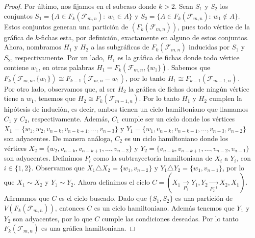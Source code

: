 \begin{proof}
        Por \'ultimo, nos fijamos en el subcaso donde $k>2$. Sean $S_1$ y $S_2$
        los conjuntos $S_1=\{A \in F_k(\mathcal{F}_{m,n}) \colon\ w_1 \in A\}$ y $S_2=\{A
        \in F_k(\mathcal{F}_{m,n}) \colon\ w_1 \notin A\}$. Estos conjuntos generan una
        partici\'on de $(F_k(\mathcal{F}_{m,n}))$, pues todo v\'ertice de la gr\'afica de
        $k$-fichas esta, por definici\'on, exactamente en alguno de estos
        conjuntos. Ahora, nombramos $H_1$ y $H_2$ a las subgr\'aficas de
        $F_k(\mathcal{F}_{m,n})$ inducidas por $S_1$ y $S_2$, respectivamente. Por un
        lado, $H_1$ es la gr\'afica de fichas donde todo v\'ertice contiene
        $w_1$, en otras palabras $H_1= F_k(\mathcal{F}_{m,n},\{w_1\})$. Sabemos que
        $F_k(\mathcal{F}_{m,n},\{w_1\}) \cong F_{k-1}(\mathcal{F}_{m,n}- w_1)$, por lo tanto $H_1
        \cong F_{k-1}(\mathcal{F}_{m-1,n})$. Por otro lado, observamos que, al ser $H_2$
        la gr\'afica de fichas donde ning\'un v\'ertice tiene a $w_1$, tenemos
        que $H_2 \cong F_k(\mathcal{F}_{m-1,n})$. Por lo tanto $H_1$ y $H_2$ cumplen la
        hip\'otesis de induci\'on, es decir, ambos tienen un ciclo hamiltoniano
        que llamamos $C_1$ y $C_2$, respectivamente. Adem\'as, $C_1$ cumple ser
        un ciclo donde los v\'ertices $X_1 = \{w_1, w_2,v_{n-k},v_{n-k+1},
        \dots, v_{n-3}\}$ y $Y_1 = \{w_1,v_{n-k},v_{n-k+1}, \dots,
        v_{n-3},v_{n-2}\}$ son adyacentes. De manera an\'aloga, $C_2$ es un
        ciclo hamiltoniano donde los v\'ertices $X_2 = \{ w_2,v_{n-k},v_{n-k+1},
        \dots, v_{n-2}\}$ y $Y_2 = \{v_{n-k},v_{n-k+1}, \dots,
        v_{n-2},v_{n-1}\}$ son adyacentes. Definimos $P_i$ como la
        subtrayectoria hamiltoniana de $X_i$ a $Y_i$, con $i \in \{ 1,2 \}$.
        Observamos que $X_1 \triangle X_2 = \{w_1,v_{n-2}\}$ y $Y_1 \triangle
        Y_2 = \{w_1, v_{n-1}\}$, por lo que $X_1 \sim X_2$ y $Y_1 \sim Y_2$.
        Ahora definimos el ciclo $C = (X_1 \xrightarrow[P_1]{}Y_1,Y_2
        \xrightarrow[P_2^{-1}]{}X_2,X_1)$. Afirmamos que $C$ es el ciclo
        buscado. Dado que $\{S_1,S_2\}$ es una partici\'on de $V(F_k(\mathcal{F}_{m,n}))$,
        entonces $C$ es un ciclo hamiltoniano. Adem\'as tenemos que $Y_1$ y
        $Y_2$ son adyacentes, por lo que $C$ cumple las condiciones deseadas.
        Por lo tanto $F_k(\mathcal{F}_{m,n})$ es una gr\'afica hamiltoniana.
        \end{proof}